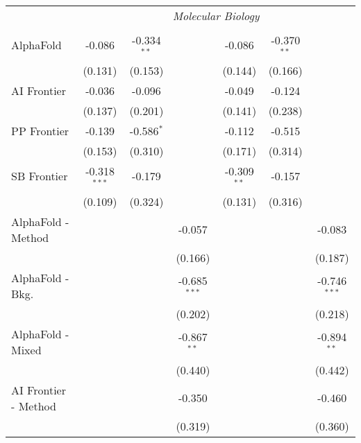 \begin{tabular}{lcccccc}
 & \multicolumn{6}{c}{\textit{Molecular Biology}} \\ \\
   AlphaFold            & -0.086         & -0.334$^{**}$ &                & -0.086        & -0.370$^{**}$ &   \\   
                        & (0.131)        & (0.153)       &                & (0.144)       & (0.166)       &   \\   
   AI Frontier          & -0.036         & -0.096        &                & -0.049        & -0.124        &   \\   
                        & (0.137)        & (0.201)       &                & (0.141)       & (0.238)       &   \\   
   PP Frontier          & -0.139         & -0.586$^{*}$  &                & -0.112        & -0.515        &   \\   
                        & (0.153)        & (0.310)       &                & (0.171)       & (0.314)       &   \\   
   SB Frontier          & -0.318$^{***}$ & -0.179        &                & -0.309$^{**}$ & -0.157        &   \\   
                        & (0.109)        & (0.324)       &                & (0.131)       & (0.316)       &   \\   
   AlphaFold - Method   &                &               & -0.057         &               &               & -0.083\\   
                        &                &               & (0.166)        &               &               & (0.187)\\   
   AlphaFold - Bkg.     &                &               & -0.685$^{***}$ &               &               & -0.746$^{***}$\\   
                        &                &               & (0.202)        &               &               & (0.218)\\   
   AlphaFold - Mixed    &                &               & -0.867$^{**}$  &               &               & -0.894$^{**}$\\   
                        &                &               & (0.440)        &               &               & (0.442)\\   
   AI Frontier - Method &                &               & -0.350         &               &               & -0.460\\   
                        &                &               & (0.319)        &               &               & (0.360)\\   

\end{tabular}
